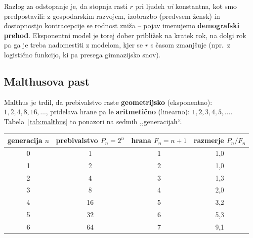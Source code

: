 \documentclass[11pt,a4paper]{article}
\begin{document}
\begin{center}
\label{fig:napoved}
\end{center}
 
Razlog za odstopanje je, da stopnja rasti $r$ pri ljudeh \emph{ni} konstantna, kot smo predpostavili: z gospodarskim razvojem, izobrazbo (predvsem žensk) in dostopnostjo kontracepcije se rodnost zniža -- pojav imenujemo \textbf{demografski prehod}. Eksponentni model je torej dober približek na kratek rok, na dolgi rok pa ga je treba nadomestiti z modelom, kjer se $r$ s časom zmanjšuje (npr.\ z logistično funkcijo, ki pa presega gimnazijsko snov).
 
\subsection*{Malthusova past}
 
Malthus je trdil, da prebivalstvo raste \textbf{geometrijsko} (eksponentno): $1,2,4,8,16,\dots$, pridelava hrane pa le \textbf{aritmetično} (linearno): $1,2,3,4,5,\dots$. Tabela~\ref{tab:malthus} to ponazori na sedmih ,,generacijah``.
 
\begin{center}
\begin{tabular}{cccc}
\toprule
generacija $n$ & prebivalstvo $P_n=2^n$ & hrana $F_n=n+1$ & razmerje $P_n/F_n$ \\
\midrule
0 & 1  & 1 & 1{,}0 \\
1 & 2  & 2 & 1{,}0 \\
2 & 4  & 3 & 1{,}3 \\
3 & 8  & 4 & 2{,}0 \\
4 & 16 & 5 & 3{,}2 \\
5 & 32 & 6 & 5{,}3 \\
6 & 64 & 7 & 9{,}1 \\
\bottomrule
\end{tabular}
\label{tab:malthus}
\end{center}
 
\end{document}
